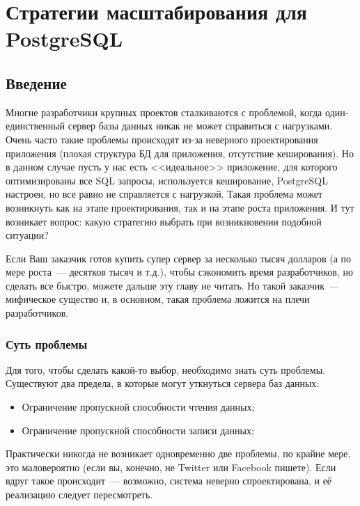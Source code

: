 \chapter{Стратегии масштабирования для PostgreSQL}

\begin{epigraphs}
\end{epigraphs}

\section{Введение}

Многие разработчики крупных проектов сталкиваются с проблемой, когда один-единственный сервер базы данных никак не может справиться с нагрузками. Очень часто такие проблемы происходят из-за неверного проектирования приложения (плохая структура БД для приложения, отсутствие кеширования). Но в данном случае пусть у нас есть <<идеальное>> приложение, для которого оптимизированы все SQL запросы, используется кеширование, PostgreSQL настроен, но все равно не справляется с нагрузкой. Такая проблема может возникнуть как на этапе проектирования, так и на этапе роста приложения. И тут возникает вопрос: какую стратегию выбрать при возникновении подобной ситуации?

Если Ваш заказчик готов купить супер сервер за несколько тысяч долларов (а по мере роста~--- десятков тысяч и т.д.), чтобы сэкономить время разработчиков, но сделать все быстро, можете дальше эту главу не читать. Но такой заказчик~--- мифическое существо и, в основном, такая проблема ложится на плечи разработчиков.

\subsection{Суть проблемы}

Для того, чтобы сделать какой-то выбор, необходимо знать суть проблемы. Существуют два предела, в которые могут уткнуться сервера баз данных:

\begin{itemize}
  \item Ограничение пропускной способности чтения данных;
  \item Ограничение пропускной способности записи данных;
\end{itemize}

Практически никогда не возникает одновременно две проблемы, по крайне мере, это маловероятно (если вы, конечно, не Twitter или Facebook пишете). Если вдруг такое происходит~--- возможно, система неверно спроектирована, и её реализацию следует пересмотреть.


